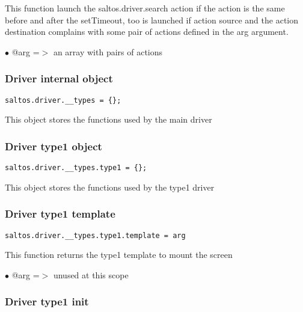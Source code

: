 \documentclass[a4paper]{article}
\begin{document}
This function launch the saltos.driver.search action if the action is the
same before and after the setTimeout, too is launched if action source and
the action destination complains with some pair of actions defined in the
arg argument.

\begin{compactitem}
\item[\color{myblue}$\bullet$] @arg =$>$ an array with pairs of actions
\end{compactitem}

\hypertarget{toc738}{}
\subsubsection{Driver internal object}

\begin{lstlisting}
saltos.driver.__types = {};
\end{lstlisting}

This object stores the functions used by the main driver

\hypertarget{toc739}{}
\subsubsection{Driver type1 object}

\begin{lstlisting}
saltos.driver.__types.type1 = {};
\end{lstlisting}

This object stores the functions used by the type1 driver

\hypertarget{toc740}{}
\subsubsection{Driver type1 template}

\begin{lstlisting}
saltos.driver.__types.type1.template = arg
\end{lstlisting}

This function returns the type1 template to mount the screen

\begin{compactitem}
\item[\color{myblue}$\bullet$] @arg =$>$ unused at this scope
\end{compactitem}

\hypertarget{toc741}{}
\subsubsection{Driver type1 init}
\end{document}
